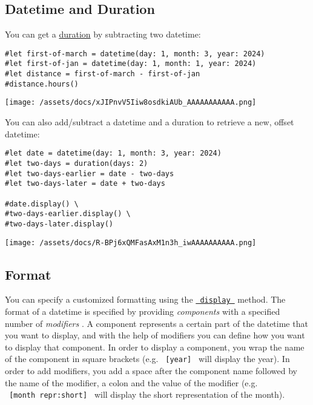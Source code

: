 \subsection{Datetime and Duration}\label{datetime-and-duration}

You can get a \href{/docs/reference/foundations/duration/}{duration} by
subtracting two datetime:

\begin{verbatim}
#let first-of-march = datetime(day: 1, month: 3, year: 2024)
#let first-of-jan = datetime(day: 1, month: 1, year: 2024)
#let distance = first-of-march - first-of-jan
#distance.hours()
\end{verbatim}

\texttt{[image: /assets/docs/xJIPnvV5Iiw8osdkiAUb\_AAAAAAAAAAA.png]}

You can also add/subtract a datetime and a duration to retrieve a new,
offset datetime:

\begin{verbatim}
#let date = datetime(day: 1, month: 3, year: 2024)
#let two-days = duration(days: 2)
#let two-days-earlier = date - two-days
#let two-days-later = date + two-days

#date.display() \
#two-days-earlier.display() \
#two-days-later.display()
\end{verbatim}

\texttt{[image: /assets/docs/R-BPj6xQMFasAxM1n3h\_iwAAAAAAAAAA.png]}

\subsection{Format}\label{format}

You can specify a customized formatting using the
\href{/docs/reference/foundations/datetime/\#definitions-display}{\texttt{\ display\ }}
method. The format of a datetime is specified by providing
\emph{components} with a specified number of \emph{modifiers} . A
component represents a certain part of the datetime that you want to
display, and with the help of modifiers you can define how you want to
display that component. In order to display a component, you wrap the
name of the component in square brackets (e.g. \texttt{\ {[}year{]}\ }
will display the year). In order to add modifiers, you add a space after
the component name followed by the name of the modifier, a colon and the
value of the modifier (e.g. \texttt{\ {[}month\ repr:short{]}\ } will
display the short representation of the month).

